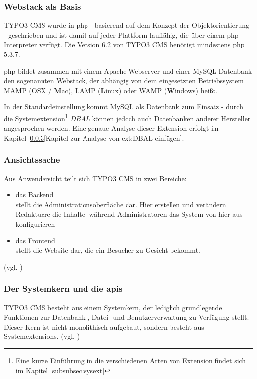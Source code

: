 \subsubsection{Webstack als Basis}

TYPO3 CMS wurde in \gls{php} - basierend auf dem Konzept der Objektorientierung - geschrieben und ist damit auf jeder Plattform lauffähig, die über einem \gls{php} Interpreter verfügt. Die Version 6.2 von TYPO3 CMS benötigt mindestens \gls{php} 5.3.7.

\gls{php} bildet zusammen mit einem Apache Webserver und einer MySQL Datenbank den sogenannten Webstack, der abhängig von dem eingesetzten Betriebssystem MAMP (OSX / {\bfseries M}ac), LAMP ({\bfseries L}inux) oder WAMP ({\bfseries W}indows) heißt.

In der Standardeinstellung kommt MySQL als Datenbank zum Einsatz - durch die Systemextension\footnote{Eine kurze Einführung in die verschiedenen Arten von Extension findet sich im Kapitel \ref{subsubsec:sysext}} \textit{DBAL} können jedoch auch Datenbanken anderer Hersteller angesprochen werden. Eine genaue Analyse dieser Extension erfolgt im Kapitel~\ref{}[Kapitel zur Analyse von ext:DBAL einfügen].

\subsubsection{Ansichtssache}
Aus Anwendersicht teilt sich TYPO3 CMS in zwei Bereiche:

\begin{itemize}
	\item das Backend\\
		stellt die Administrationsoberfläche dar. Hier erstellen und verändern Redaktuere die Inhalte; während Administratoren das System von hier aus konfigurieren
	\item das Frontend\\
		stellt die Website dar, die ein Besucher zu Gesicht bekommt.
\end{itemize}
(vgl. \cite[S. 5]{book:dulepovTypo32008})

\subsubsection{Der Systemkern und die \gls{api}s}
TYPO3 CMS besteht aus einem Systemkern, der lediglich grundlegende Funktionen zur Datenbank-, Datei- und Benutzerverwaltung zu Verfügung stellt. Dieser Kern ist nicht monolithisch aufgebaut, sondern besteht aus Systemextensions. (vgl. \cite[S. 32]{book:laborenzTypo32006})

